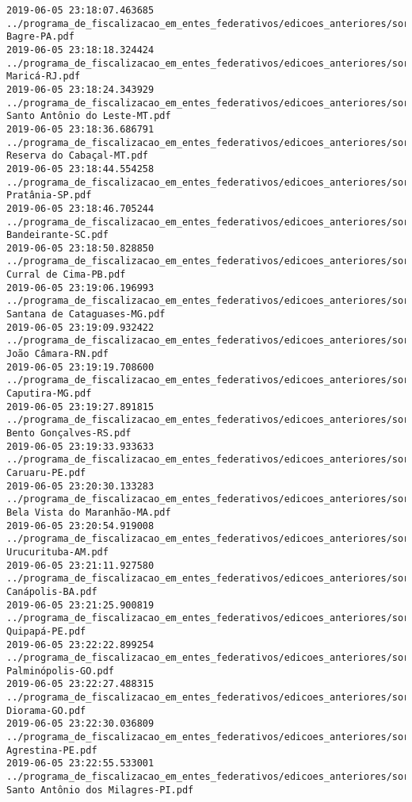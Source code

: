 \begin{lstlisting}
2019-06-05 23:18:07.463685 ../programa_de_fiscalizacao_em_entes_federativos/edicoes_anteriores/sorteio_34/1853-Bagre-PA.pdf
2019-06-05 23:18:18.324424 ../programa_de_fiscalizacao_em_entes_federativos/edicoes_anteriores/sorteio_34/1866-Maricá-RJ.pdf
2019-06-05 23:18:24.343929 ../programa_de_fiscalizacao_em_entes_federativos/edicoes_anteriores/sorteio_34/1852-Santo Antônio do Leste-MT.pdf
2019-06-05 23:18:36.686791 ../programa_de_fiscalizacao_em_entes_federativos/edicoes_anteriores/sorteio_34/1851-Reserva do Cabaçal-MT.pdf
2019-06-05 23:18:44.554258 ../programa_de_fiscalizacao_em_entes_federativos/edicoes_anteriores/sorteio_34/1881-Pratânia-SP.pdf
2019-06-05 23:18:46.705244 ../programa_de_fiscalizacao_em_entes_federativos/edicoes_anteriores/sorteio_34/1874-Bandeirante-SC.pdf
2019-06-05 23:18:50.828850 ../programa_de_fiscalizacao_em_entes_federativos/edicoes_anteriores/sorteio_34/1856-Curral de Cima-PB.pdf
2019-06-05 23:19:06.196993 ../programa_de_fiscalizacao_em_entes_federativos/edicoes_anteriores/sorteio_34/1849-Santana de Cataguases-MG.pdf
2019-06-05 23:19:09.932422 ../programa_de_fiscalizacao_em_entes_federativos/edicoes_anteriores/sorteio_34/1868-João Câmara-RN.pdf
2019-06-05 23:19:19.708600 ../programa_de_fiscalizacao_em_entes_federativos/edicoes_anteriores/sorteio_34/1845-Caputira-MG.pdf
2019-06-05 23:19:27.891815 ../programa_de_fiscalizacao_em_entes_federativos/edicoes_anteriores/sorteio_34/1871-Bento Gonçalves-RS.pdf
2019-06-05 23:19:33.933633 ../programa_de_fiscalizacao_em_entes_federativos/edicoes_anteriores/sorteio_34/1858-Caruaru-PE.pdf
2019-06-05 23:20:30.133283 ../programa_de_fiscalizacao_em_entes_federativos/edicoes_anteriores/sorteio_34/1841-Bela Vista do Maranhão-MA.pdf
2019-06-05 23:20:54.919008 ../programa_de_fiscalizacao_em_entes_federativos/edicoes_anteriores/sorteio_34/1827-Urucurituba-AM.pdf
2019-06-05 23:21:11.927580 ../programa_de_fiscalizacao_em_entes_federativos/edicoes_anteriores/sorteio_34/1830-Canápolis-BA.pdf
2019-06-05 23:21:25.900819 ../programa_de_fiscalizacao_em_entes_federativos/edicoes_anteriores/sorteio_34/1859-Quipapá-PE.pdf
2019-06-05 23:22:22.899254 ../programa_de_fiscalizacao_em_entes_federativos/edicoes_anteriores/sorteio_35/1897-Palminópolis-GO.pdf
2019-06-05 23:22:27.488315 ../programa_de_fiscalizacao_em_entes_federativos/edicoes_anteriores/sorteio_35/1896-Diorama-GO.pdf
2019-06-05 23:22:30.036809 ../programa_de_fiscalizacao_em_entes_federativos/edicoes_anteriores/sorteio_35/1916-Agrestina-PE.pdf
2019-06-05 23:22:55.533001 ../programa_de_fiscalizacao_em_entes_federativos/edicoes_anteriores/sorteio_35/1920-Santo Antônio dos Milagres-PI.pdf

\end{lstlisting}
